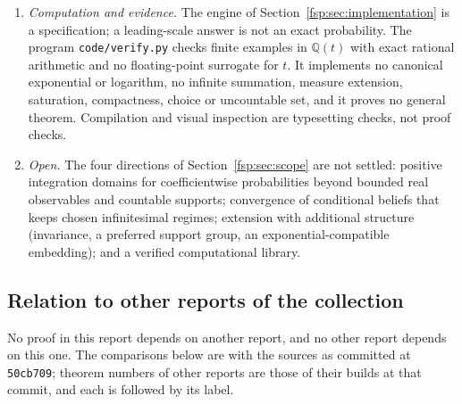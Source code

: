 \documentclass[11pt,a4paper]{article}
\numberwithin{equation}{section}
\theoremstyle{definition}
\theoremstyle{remark}
\newcommand{\Q}{\mathbb Q}
\begin{document}
\begin{enumerate}[label=(N\arabic*),leftmargin=3.2em]
import ordinary component laws or a stated nonstandard model.
\item \emph{Computation and evidence.} The engine of
Section~\ref{fsp:sec:implementation} is a specification; a leading-scale answer
is not an exact probability. The program \texttt{code/verify.py} checks finite
examples in $\Q(t)$ with exact rational arithmetic and no floating-point
surrogate for $t$. It implements no canonical exponential or logarithm, no
infinite summation, measure extension, saturation, compactness, choice or
uncountable set, and it proves no general theorem. Compilation and visual
inspection are typesetting checks, not proof checks.
\item \emph{Open.} The four directions of Section~\ref{fsp:sec:scope} are not
settled: positive integration domains for coefficientwise probabilities beyond
bounded real observables and countable supports; convergence of conditional
beliefs that keeps chosen infinitesimal regimes; extension with additional
structure (invariance, a preferred support group, an exponential-compatible
embedding); and a verified computational library.
\end{enumerate}

\subsection{Relation to other reports of the collection}\label{fsp:sec:neighbours}
No proof in this report depends on another report, and no other report
depends on this one. The comparisons below are with the sources as committed
at \texttt{50cb709}; theorem numbers of other reports are those of their
builds at that commit, and each is followed by its label.
\end{document}
